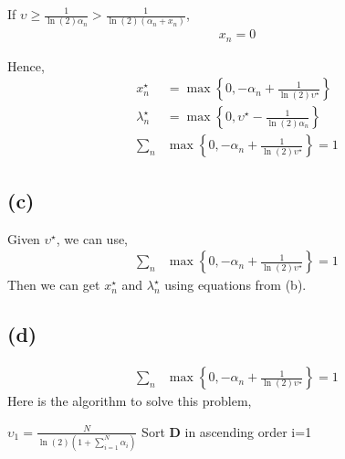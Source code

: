 \documentclass[12pt, a4 paper]{article}
\begin{document}
\begin{framed}
        If $\upsilon \geq \frac{1}{\ln(2) \alpha_{n}} > \frac{1}
        {\ln(2) (\alpha_{n}+ x_{n})}$,
        \begin{align}
            x_{n} = 0
        \end{align}

        \indent Hence,
            \begin{align}
                x^{\star}_{n} &= \max \left\{ 0, -\alpha_{n} + 
                \frac{1}{\ln(2) \upsilon^{\star}} \right\}\\
                \lambda^{\star}_{n} &= \max \left\{ 
                    0, \upsilon^{\star} - \frac{1}{\ln(2)\alpha_{n}}
                \right\}\\
                \sum\limits_{n} &\max \left\{ 0, -\alpha_{n} + 
                \frac{1}{\ln(2) \upsilon^{\star}} \right\} = 1
            \end{align}


        \subsection{(c)}
        Given $\upsilon^{\star}$, we can use,
        \begin{align}
            \sum\limits_{n} &\max \left\{ 0, -\alpha_{n} + 
            \frac{1}{\ln(2) \upsilon^{\star}} \right\} = 1
        \end{align}
        \indent Then we can get $x^{\star}_{n}$ and $\lambda_{n}^{\star}$ using equations
         from (b).

         \subsection{(d)}
         \begin{align}
            \sum\limits_{n} &\max \left\{ 0, -\alpha_{n} + 
            \frac{1}{\ln(2) \upsilon^{\star}} \right\} = 1
        \end{align}
        \indent Here is the algorithm to solve this problem,


        \begin{algorithm}[H]
            \SetAlgoLined
            \KwResult{$\upsilon^{\star}$}
            $\upsilon_{1} = \frac{N}{\ln(2) (1+\sum_{i=1}^{N} \alpha_{i})}$\;
            Sort $\mathbf{D}$ in ascending order\;
            i=1\;
            
\end{algorithm}
\end{framed}
\end{document}
